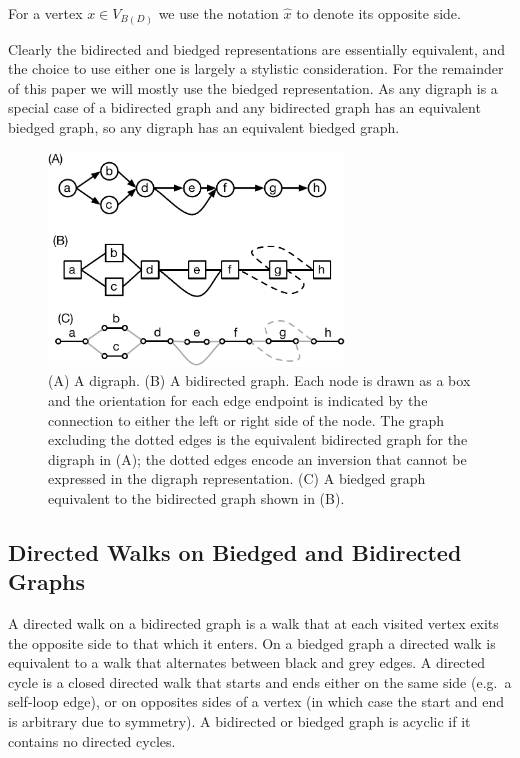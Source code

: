 \documentclass[11pt]{ucthesis}
\begin{document}
For a vertex $x \in V_{B(D)}$ we use the notation $\hat{x}$ to denote its opposite side.

Clearly the bidirected and biedged representations are essentially equivalent, and the choice to use either one is largely a stylistic consideration. For the remainder of this paper we will mostly use the biedged representation. As any digraph is a special case of a bidirected graph and any bidirected graph has an equivalent biedged graph, so any digraph has an equivalent biedged graph.

\begin{figure}
\centering
\includegraphics[width=0.7\textwidth]{snarlfigures/fig1.pdf}
\caption{\label{fig:digraphs_and_bigraphs} (A) A digraph.
(B) A bidirected graph. Each node is drawn as a box and the orientation for each edge endpoint is indicated by the connection to either the left or right side of the node. The graph excluding the dotted edges is the equivalent bidirected graph for the digraph in (A); the dotted edges encode an inversion that cannot be expressed in the digraph representation. (C) A biedged graph equivalent to the bidirected graph shown in (B).}
\end{figure}

\subsection{Directed Walks on Biedged and Bidirected Graphs}

A directed walk on a bidirected graph is a walk that at each visited vertex exits the opposite side to that which it enters. On a biedged graph a directed walk is equivalent to a walk that alternates between black and grey edges. A directed cycle is a closed directed walk that starts and ends either on the same side (e.g.\ a self-loop edge), or on opposites sides of a vertex (in which case the start and end is arbitrary due to symmetry). A bidirected or biedged graph is acyclic if it contains no directed cycles. 
\end{document}
